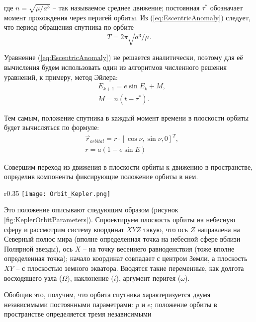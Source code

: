 где $n = \sqrt{\mu/a^3}$ -- так называемое среднее движение; постоянная $\tau^*$
обозначает момент прохождения через перигей орбиты. Из (\ref{eq:EscentricAnomaly})
следует, что период обращения спутника по орбите
\begin{equation}
  T = 2\pi\sqrt{a^3/\mu}.
\end{equation}\par
Уравнение (\ref{eq:EscentricAnomaly}) не решается аналитически, поэтому для её
вычисления будем использовать один из алгоритмов численного решения уравнений, к примеру,
метод Эйлера:
\begin{equation}
  \begin{aligned}
    & E_{k+1} = e\sin E_k + M, \\
    & M = n(t - \tau^*).
  \end{aligned}
\end{equation}\par
Тем самым, положение спутника в каждый момент времени в плоскости орбиты
будет вычисляться по формуле:
\begin{equation}
  \begin{aligned}
    & \vec{r}_{orbital} = r \cdot [\cos\nu, \sin\nu, 0]^{T}, \\
    & r = a(1 - e\sin E)
  \end{aligned}
\end{equation}\par
Совершим переход из движения в плоскости орбиты к движению в пространстве, определив
компоненты фиксирующие положение орбиты в нем.
\begin{wrapfigure}{r}{0.35\textwidth}
  \texttt{[image: Orbit\_Kepler.png]}
  \caption{Кеплеровы элементы}
  \label{fig:KeplerOrbitParameters}
\end{wrapfigure}
Это положение описывают следующим образом (рисунок \ref{fig:KeplerOrbitParameters}).
Спроектируем плоскость орбиты на небесную сферу и рассмотрим систему координат $XYZ$
такую, что ось $Z$ направлена на Северный полюс мира (вполне определенная точка
на небесной сфере вблизи Полярной звезды), ось $X$ -- на точку весеннего
равноденствия (тоже вполне определенная точка); начало координат совпадает с
центром Земли, а плоскость $XY$ -- с плоскостью земного экватора.
Вводятся такие переменные, как долгота восходящего узла ($\Omega$), наклонение ($i$),
аргумент перигея ($\omega$).\par
Обобщив это, получим, что орбита спутника характеризуется двумя независимыми постоянными
параметрами: $p$ и $e$; положение орбиты в пространстве определяется тремя независимыми
